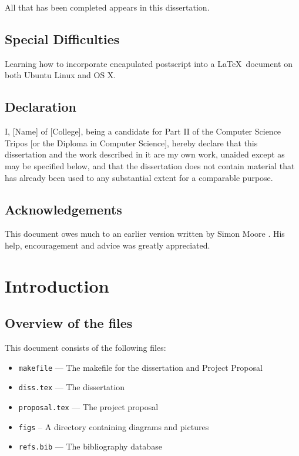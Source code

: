 \documentclass[12pt,a4paper,twoside,openright]{report}
\begin{document}
All that has been completed appears in this dissertation.

\section*{Special Difficulties}

Learning how to incorporate encapulated postscript into a \LaTeX\
document on both Ubuntu Linux and OS X.
 
\newpage
\section*{Declaration}

I, [Name] of [College], being a candidate for Part II of the Computer
Science Tripos [or the Diploma in Computer Science], hereby declare
that this dissertation and the work described in it are my own work,
unaided except as may be specified below, and that the dissertation
does not contain material that has already been used to any substantial
extent for a comparable purpose.

\bigskip
{}

\medskip
{}

\tableofcontents

\listoffigures

\newpage
\section*{Acknowledgements}

This document owes much to an earlier version written by Simon Moore
\cite{Moore95}.  His help, encouragement and advice was greatly 
appreciated.


\pagestyle{headings}

\chapter{Introduction}

\section{Overview of the files}

This document consists of the following files:

\begin{itemize}
\item \texttt{makefile} --- The makefile for the dissertation and
                         Project Proposal
\item \texttt{diss.tex} --- The dissertation
\item \texttt{proposal.tex}  --- The project proposal 
\item \texttt{figs} -- A directory containing diagrams and pictures
\item \texttt{refs.bib} --- The bibliography database
\end{itemize}
\end{document}
